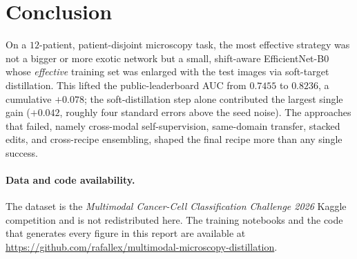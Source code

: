 \documentclass[11pt]{article}
\begin{document}
\section{Conclusion}

On a $12$-patient, patient-disjoint microscopy task, the most effective strategy was not a bigger or more
exotic network but a small, shift-aware EfficientNet-B0 whose \emph{effective} training set was enlarged
with the test images via soft-target distillation. This lifted the public-leaderboard AUC from $0.7455$
to $0.8236$, a cumulative $+0.078$; the soft-distillation step alone contributed the largest single gain
($+0.042$, roughly four standard errors above the seed noise). The approaches that failed, namely cross-modal
self-supervision, same-domain transfer, stacked edits, and cross-recipe ensembling, shaped the final
recipe more than any single success.

\paragraph{Data and code availability.} The dataset is the \emph{Multimodal Cancer-Cell Classification
Challenge 2026} Kaggle competition and is not redistributed here. The training notebooks and the code
that generates every figure in this report are available at
\url{https://github.com/rafallex/multimodal-microscopy-distillation}.



\end{document}
